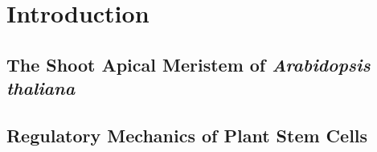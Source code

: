 
\chapter{Introduction}  %

\ifpdf
    \graphicspath{{Chapter1/Figs/Raster/}{Chapter1/Figs/PDF/}{Chapter1/Figs/}}
\else
    \graphicspath{{Chapter1/Figs/Vector/}{Chapter1/Figs/}}
\fi

\section{The Shoot Apical Meristem of \textit{Arabidopsis thaliana}} %




\section{Regulatory Mechanics of Plant Stem Cells} %


